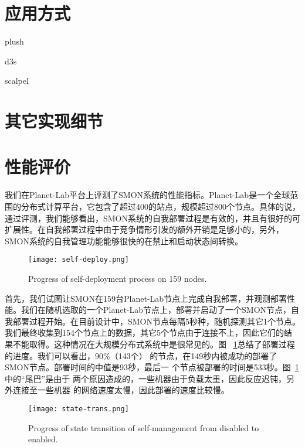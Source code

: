 \section{应用方式}
\label{sec:smon_app}
plush

d3s

scalpel

\section{其它实现细节}



\section{性能评价}

我们在Planet-Lab平台上评测了SMON系统的性能指标。Planet-Lab是一个全球范
围的分布式计算平台，它包含了超过400的站点，规模超过800个节点。具体的说，
通过评测，我们能够看出，SMON系统的自我部署过程是有效的，并且有很好的可
扩展性。在自我部署过程中由于竞争情形引发的额外开销是足够小的，另外，
SMON系统的自我管理功能能够很快的在禁止和启动状态间转换。

\begin{figure}
\centering
  \begin{minipage}{0.8\linewidth}
    \centering
    \texttt{[image: self-deploy.png]}
    \caption{Progress of self-deployment process on 159
    nodes.}
    \label{fig:self-deploy}
  \end{minipage}
\end{figure}

首先，我们试图让SMON在159台Planet-Lab节点上完成自我部署，并观测部署性
能。我们在随机选取的一个Planet-Lab节点上，部署并启动了一个SMON节点，自
我部署过程开始。在目前设计中，SMON节点每隔5秒种，随机探测其它1个节点。
我们最终收集到154个节点上的数据，其它5个节点由于连接不上，因此它们的结
果不能取得。这种情况在大规模分布式系统中是很常见的。图~
\ref{fig:self-deploy}总结了部署过程的进度。我们可以看出，90\%（143个）
的节点，在149秒内被成功的部署了SMON节点。部署时间的中值是93秒，最后一
个节点被部署的时间是533秒。图~\ref{fig:self-deploy}中的“尾巴”是由于
两个原因造成的，一些机器由于负载太重，因此反应迟钝，另外连接至一些机器
的网络速度太慢，因此部署的速度比较慢。

\begin{figure}
\centering
  \begin{minipage}{0.8\linewidth}
    \centering
    \texttt{[image: state-trans.png]}
    \caption{Progress of state transition of self-management from disabled to
    enabled.}
    \label{fig:state-transition}
  \end{minipage}
\end{figure}


